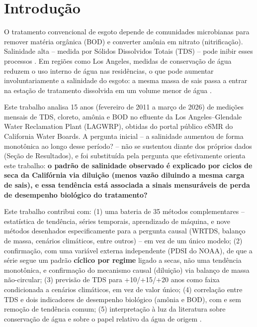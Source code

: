 \section{Introdução}

O tratamento convencional de esgoto depende de comunidades microbianas para remover matéria orgânica (BOD) e converter amônia em nitrato (nitrificação). Salinidade alta -- medida por Sólidos Dissolvidos Totais (TDS) -- pode inibir esses processos \cite{schwabe2020unintended}. Em regiões como Los Angeles, medidas de conservação de água reduzem o uso interno de água nas residências, o que pode aumentar involuntariamente a salinidade do esgoto: a mesma massa de sais passa a entrar na estação de tratamento dissolvida em um volume menor de água \cite{schwabe2020unintended}.

Este trabalho analisa 15 anos (fevereiro de 2011 a março de 2026) de medições mensais de TDS, cloreto, amônia e BOD no efluente da Los Angeles--Glendale Water Reclamation Plant (LAGWRP), obtidas do portal público eSMR do California Water Boards. A pergunta inicial -- a salinidade aumentou de forma monotônica ao longo desse período? -- não se sustentou diante dos próprios dados (Seção de Resultados), e foi substituída pela pergunta que efetivamente orienta este trabalho: \textbf{o padrão de salinidade observado é explicado por ciclos de seca da Califórnia via diluição (menos vazão diluindo a mesma carga de sais), e essa tendência está associada a sinais mensuráveis de perda de desempenho biológico do tratamento?}

Este trabalho contribui com: (1) uma bateria de 35 métodos complementares -- estatística de tendência, séries temporais, aprendizado de máquina, e nove métodos desenhados especificamente para a pergunta causal (WRTDS, balanço de massa, cenários climáticos, entre outros) -- em vez de um único modelo; (2) confirmação, com uma variável externa independente (PDSI do NOAA), de que a série segue um padrão \textbf{cíclico por regime} ligado a secas, não uma tendência monotônica, e confirmação do mecanismo causal (diluição) via balanço de massa não-circular; (3) previsão de TDS para +10/+15/+20 anos como faixa condicionada a cenários climáticos, em vez de valor único; (4) correlação entre TDS e dois indicadores de desempenho biológico (amônia e BOD), com e sem remoção de tendência comum; (5) interpretação à luz da literatura sobre conservação de água \cite{schwabe2020unintended} e sobre o papel relativo da água de origem \cite{scsc2018tds}.
